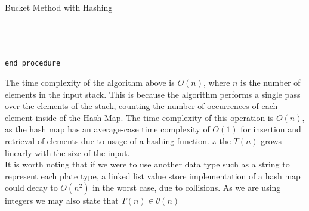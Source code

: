 \documentclass[a4paper]{article}
\begin{document}



\begin{algorithm}
\caption{Bucket Method with Hashing}\label{euclid}
\begin{algorithmic}[1]
 \\

\State{}
\State{}
\State\quad{}
\State\quad{}
\State\quad\quad{}
\State\quad{}
\State{}\\

\State{}
\State\quad{}
\State\quad\quad{}
\State\quad\quad{}
\State\quad{}
\State{} \\
{\tt end procedure}
\EndProcedure
\end{algorithmic}
\end{algorithm}




The time complexity of the algorithm above is $O(n)$,
where $n$ is the number of elements in the input stack. 
This is because the algorithm performs a single pass over the elements of the stack,
counting the number of occurrences of each element inside of the Hash-Map. 
The time complexity of this operation is $O(n)$, 
as the hash map has an average-case time complexity of $O(1)$ for insertion and retrieval of elements
due to usage of a hashing function.
$\therefore$ the $T(n)$ grows linearly with the size of the input. \\

It is worth noting that if we were to use another data type such as a string to represent each plate type,
a linked list value store implementation of a hash map could decay to $O(n^2)$ in the worst case, due to collisions.
As we are using integers we may also state that  $T(n) \in \theta (n)$ \\
\end{document}
